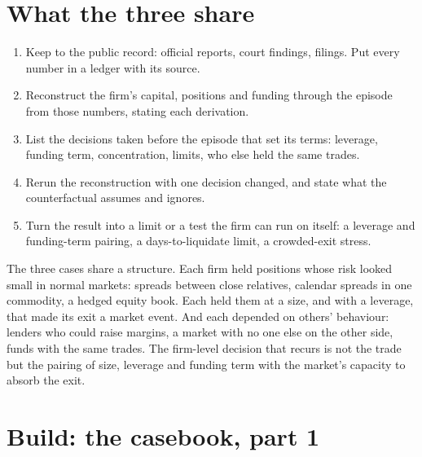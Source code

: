 \section{What the three share}

\begin{method}\label{met:fm:case-studies-i:read}
\begin{enumerate}
\item Keep to the public record: official reports, court findings, filings. Put every number in a ledger with its source.
\item Reconstruct the firm's capital, positions and funding through the episode from those numbers, stating each derivation.
\item List the decisions taken before the episode that set its terms: leverage, funding term, concentration, limits, who else held the same trades.
\item Rerun the reconstruction with one decision changed, and state what the counterfactual assumes and ignores.
\item Turn the result into a limit or a test the firm can run on itself: a leverage and funding-term pairing, a days-to-liquidate limit, a
crowded-exit stress.
\end{enumerate}
\end{method}

The three cases share a structure. Each firm held positions whose risk looked small in normal markets: spreads between close relatives, calendar
spreads in one commodity, a hedged equity book. Each held them at a size, and with a leverage, that made its exit a market event. And each depended
on others' behaviour: lenders who could raise margins, a market with no one else on the other side, funds with the same trades. The firm-level
decision that recurs is not the trade but the pairing of size, leverage and funding term with the market's capacity to absorb the exit.

\section{Build: the casebook, part 1}\label{bld:fm:case-studies-i:casebook}

